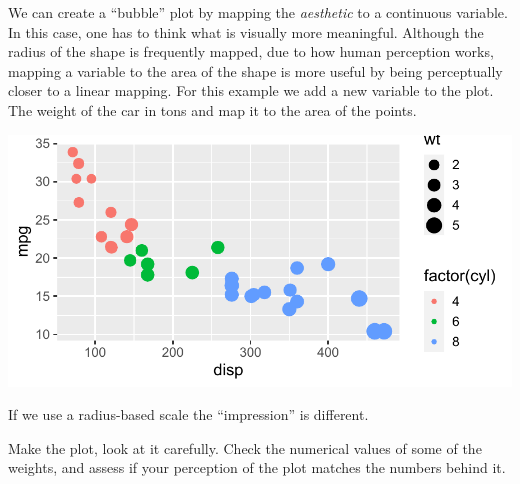 \documentclass[krantz2]{krantz}\usepackage{knitr}
\begin{document}
We can create a ``bubble'' plot by mapping the  \emph{aesthetic} to a continuous variable. In this case, one has to think what is visually more meaningful. Although the radius of the shape is frequently mapped, due to how human perception works, mapping a variable to the area of the shape is more useful by being perceptually closer to a linear mapping. For this example we add a new variable to the plot. The weight of the car in tons and map it to the area of the points.

\begin{knitrout}\footnotesize
{}\color{fgcolor}\begin{kframe}
\begin{alltt}
\hlstd{(}  \hlstd{(}   
                           \hlstd{=} 
                            \hlopt{+}
  \hlstd{()} \hlopt{+}
  \hlstd{()}
\end{alltt}
\end{kframe}

{\centering \includegraphics[width=.7\textwidth]{figure/pos-scatter-16-1}

}



\end{knitrout}

\begin{playground}
If we use a radius-based scale the ``impression'' is different.

\begin{knitrout}\footnotesize
{}\color{fgcolor}\begin{kframe}
\begin{alltt}
\hlstd{(}  \hlstd{(}   
                           \hlstd{=} 
                            \hlopt{+}
  \hlstd{()} \hlopt{+}
  \hlstd{()}
\end{alltt}
\end{kframe}
\end{knitrout}

Make the plot, look at it carefully. Check the numerical values of some of the weights, and assess if your perception of the plot matches the numbers behind it.
\end{playground}
\end{document}
